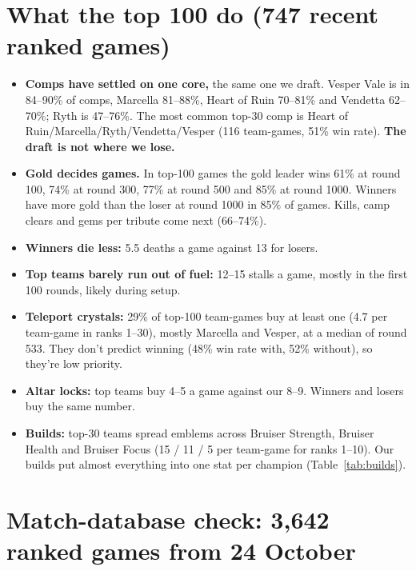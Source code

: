 \documentclass[11pt,a4paper]{article}
\begin{document}
\section{What the top 100 do (747 recent ranked games)}

\begin{itemize}
  \item \textbf{Comps have settled on one core,} the same one we draft. Vesper Vale is in 84--90\% of comps, Marcella 81--88\%, Heart of Ruin 70--81\% and Vendetta 62--70\%; Ryth is 47--76\%. The most common top-30 comp is Heart of Ruin/Marcella/Ryth/Vendetta/Vesper (116 team-games, 51\% win rate). \textbf{The draft is not where we lose.}
  \item \textbf{Gold decides games.} In top-100 games the gold leader wins 61\% at round 100, 74\% at round 300, 77\% at round 500 and 85\% at round 1000. Winners have more gold than the loser at round 1000 in 85\% of games. Kills, camp clears and gems per tribute come next (66--74\%).
  \item \textbf{Winners die less:} 5.5 deaths a game against 13 for losers.
  \item \textbf{Top teams barely run out of fuel:} 12--15 stalls a game, mostly in the first 100 rounds, likely during setup.
  \item \textbf{Teleport crystals:} 29\% of top-100 team-games buy at least one (4.7 per team-game in ranks 1--30), mostly Marcella and Vesper, at a median of round 533. They don't predict winning (48\% win rate with, 52\% without), so they're low priority.
  \item \textbf{Altar locks:} top teams buy 4--5 a game against our 8--9. Winners and losers buy the same number.
  \item \textbf{Builds:} top-30 teams spread emblems across Bruiser Strength, Bruiser Health and Bruiser Focus (15 / 11 / 5 per team-game for ranks 1--10). Our builds put almost everything into one stat per champion (Table~\ref{tab:builds}).
\end{itemize}

\section{Match-database check: 3,642 ranked games from 24 October}
\label{sec:db}
\end{document}
